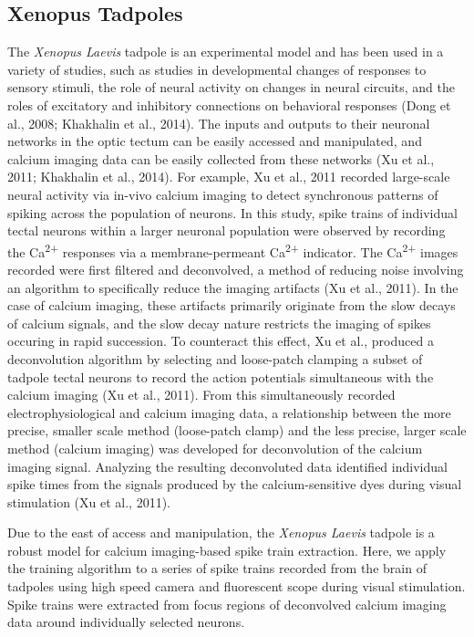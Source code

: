 \documentclass[11pt]{article}
\begin{document}
\subsection{Xenopus Tadpoles}
The \textit{Xenopus Laevis} tadpole is an experimental model and has been used in a variety of studies, such as studies in developmental changes of responses to sensory stimuli, the role of neural activity on changes in neural circuits, and the roles of excitatory and inhibitory connections on behavioral responses (Dong et al., 2008; Khakhalin et al., 2014).
The inputs and outputs to their neuronal networks in the optic tectum can be easily accessed and manipulated, and calcium imaging data can be easily collected from these networks (Xu et al., 2011; Khakhalin et al., 2014). For example, Xu et al., 2011 recorded large-scale neural activity via in-vivo calcium imaging to detect synchronous patterns of spiking across the population of neurons. In this study, spike trains of individual tectal neurons within a larger neuronal population were observed by recording the Ca\textsuperscript{2+} responses via a membrane-permeant Ca\textsuperscript{2+} indicator. The Ca\textsuperscript{2+} images recorded were first filtered and deconvolved, a method of reducing noise involving an algorithm to specifically reduce the imaging artifacts (Xu et al., 2011). In the case of calcium imaging, these artifacts primarily originate from the slow decays of calcium signals, and the slow decay nature restricts the imaging of spikes occuring in rapid succession. To counteract this effect, Xu et al., produced a deconvolution algorithm by selecting and loose-patch clamping a subset of tadpole tectal neurons to record the action potentials simultaneous with the calcium imaging (Xu et al., 2011). From this simultaneously recorded electrophysiological and calcium imaging data, a relationship between the more precise, smaller scale method (loose-patch clamp) and the less precise, larger scale method (calcium imaging) was developed for deconvolution of the calcium imaging signal. Analyzing the resulting deconvoluted data identified individual spike times from the signals produced by the calcium-sensitive dyes during visual stimulation (Xu et al., 2011).\par
Due to the east of access and manipulation, the \textit{Xenopus Laevis} tadpole is a robust model for calcium imaging-based spike train extraction. Here, we apply the training algorithm to a series of spike trains recorded from the brain of tadpoles using high speed camera and fluorescent scope during visual stimulation. Spike trains were extracted from focus regions of deconvolved calcium imaging data around individually selected neurons.
\end{document}
